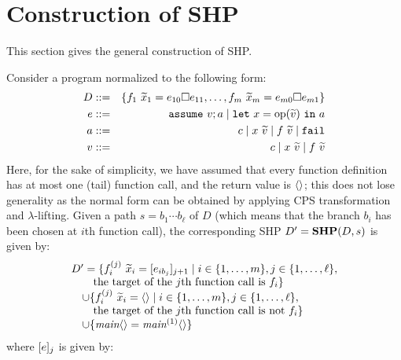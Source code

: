 \section{Construction of SHP}
\label{sec:shp}


This section gives the general construction of SHP.

Consider a program normalized to the following form:
\begin{eqnarray*}
D&::=& \{f_1\ \widetilde{x}_1 = e_{10}\square e_{11},\ldots,f_m\ \widetilde{x}_m = e_{m0}\square e_{m1}\} \\
e&::=& \mathtt{assume~}v; a \mid \mathtt{let~}x=\mathrm{op}(\widetilde{v})\mathtt{~in~}{a}\\
a &::=& c \mid x\ \widetilde{v} \mid f\ \widetilde{v} \mid \mathtt{fail} \\
v&::=& c \mid x\ \widetilde{v} \mid f\ \widetilde{v}
\end{eqnarray*}
Here, for the sake of simplicity, we have assumed that every function definition has
at most one (tail) function call, and the return value is \(\langle{}\rangle\); this does not
lose generality as the normal form can be obtained by applying CPS transformation and \(\lambda\)-lifting.
Given a path \(s = b_1\cdots b_\ell\) of \(D\)
(which means that the branch \(b_i\) has been chosen at \(i\)th function call), 
the corresponding SHP \(D' = \textbf{SHP}(D, s)\) is given by:
\[
\begin{array}{l}
D' = \{f_i^{(j)}\ \widetilde{x}_i = [e_{ib_j}]_{j+1} \mid i\in\{1,\ldots,m\}, j\in\{1,\ldots,\ell\},\\
\qquad               \mbox{the target of the \(j\)th function call is \(f_i\)}\}\\
\quad \cup 
  \{f_i^{(j)}\ \widetilde{x}_i = \langle{}\rangle \mid i\in\{1,\ldots,m\}, j\in\{1,\ldots,\ell\},\\
\qquad                  \mbox{the target of the \(j\)th function call is not \(f_i\)}\}\\
\quad \cup \{\textit{main}\langle{}\rangle = \textit{main}^{(1)}\langle{}\rangle\}
\end{array}
\]
where \([e]_{j}\) is given by:
